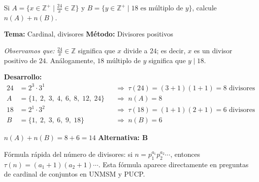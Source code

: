 \begin{tcolorbox}[
  enhanced, breakable,
  colback=GrisClaro, colframe=AzulPizarra,
  fonttitle=\bfseries\sffamily,
  title={Ejercicio 6 --- Nivel Intermedio},
  arc=3pt, boxrule=0.8pt
]
\begin{problema}
  Si $A = \{x \in \mathbb{Z}^{+} \mid \tfrac{24}{x} \in \mathbb{Z}\}$ y
  $B = \{y \in \mathbb{Z}^{+} \mid 18 \text{ es m\'ultiplo de } y\}$,
  calcule $n(A) + n(B)$.
\end{problema}

\smallskip
\noindent
\textbf{\sffamily\color{AzulMedio}Tema:} Cardinal, divisores
\hfill
\textbf{\sffamily\color{AzulMedio}M\'etodo:} Divisores positivos

\medskip
\noindent\textit{Observamos que:} $\tfrac{24}{x} \in \mathbb{Z}$ significa que
$x$ divide a $24$; es decir, $x$ es un divisor positivo de $24$. An\'alogamente,
$18$ m\'ultiplo de $y$ significa que $y \mid 18$.

\medskip
\noindent\textbf{\sffamily Desarrollo:}
\begin{align*}
  24 &= 2^{3} \cdot 3^{1}
  &&\Rightarrow\; \tau(24) = (3+1)(1+1) = 8 \text{ divisores} \\
  A  &= \{1,\;2,\;3,\;4,\;6,\;8,\;12,\;24\}
  &&\Rightarrow\; n(A) = 8 \\[6pt]
  18 &= 2^{1} \cdot 3^{2}
  &&\Rightarrow\; \tau(18) = (1+1)(2+1) = 6 \text{ divisores} \\
  B  &= \{1,\;2,\;3,\;6,\;9,\;18\}
  &&\Rightarrow\; n(B) = 6
\end{align*}

\begin{tcolorbox}[
  colback=AzulClaro!60, colframe=AzulPizarra,
  arc=2pt, boxrule=0.8pt, left=8pt, right=8pt
]
\centering
$\displaystyle \boxed{n(A) + n(B) = 8 + 6 = 14}$ \quad
\textbf{Alternativa: B}
\end{tcolorbox}

\begin{cajatip}
  F\'ormula r\'apida del n\'umero de divisores:
  si $n = p_{1}^{a_{1}} p_{2}^{a_{2}} \cdots$, entonces
  $\tau(n) = (a_1+1)(a_2+1)\cdots$.
  Esta f\'ormula aparece directamente en preguntas de cardinal de conjuntos en
  UNMSM y PUCP.
\end{cajatip}
\end{tcolorbox}

\vspace{0.5cm}

